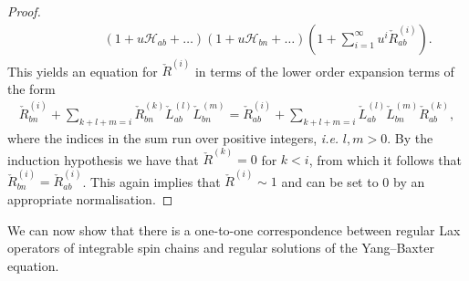 \documentclass{article}
\begin{document}
\begin{proof}
\begin{align}
&\qquad\qquad (1+u \mathcal{H}_{ab} +\ldots) (1+u \mathcal{H}_{bn} +\ldots) (1+ \sum^\infty_{i=1} u^i \check{R}^{(i)}_{ab} ).
\end{align}
%
This yields an equation for $\check{R}^{(i)}$ in terms of the lower order expansion terms of the form
%
\begin{align}
\check{R}^{(i)}_{bn} + \sum_{k+l+m=i} \check{R}^{(k)}_{bn}\check{L}^{(l)}_{ab}\check{L}^{(m)}_{bn} = \check{R}^{(i)}_{ab} + \sum_{k+l+m=i} \check{L}^{(l)}_{ab}\check{L}^{(m)}_{bn} \check{R}^{(k)}_{ab},
\end{align}
%
where the indices in the sum run over positive integers, \textit{i.e.} $l,m>0$. By the induction hypothesis we have that $\check{R}^{(k)}=0$ for $k<i$, from which it follows that $\check{R}^{(i)}_{bn} = \check{R}^{(i)}_{ab}$. This again implies that $\check{R}^{(i)}\sim1$ and can be set to 0 by an appropriate normalisation.
\end{proof}

We can now show that there is a one-to-one correspondence between regular Lax operators of integrable spin chains and regular solutions of the Yang--Baxter equation.
\end{document}
